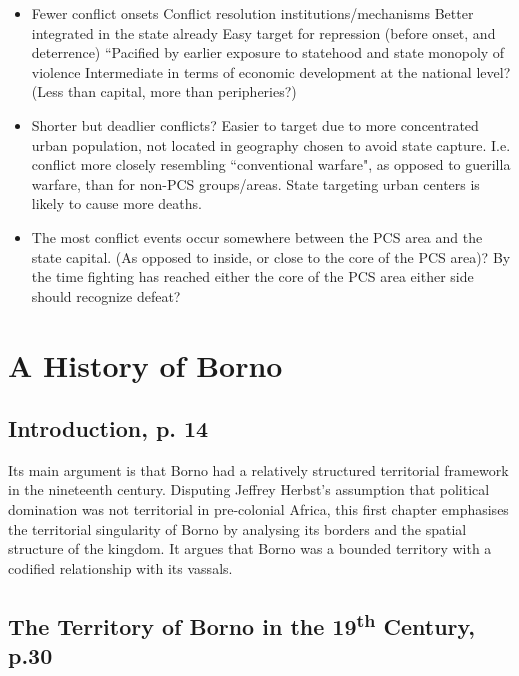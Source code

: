 \documentclass[12pt]{article}
\begin{document}
\begin{itemize}
	\item Fewer conflict onsets
		\subitem Conflict resolution institutions/mechanisms
		\subitem Better integrated in the state already
		\subitem Easy target for repression (before onset, and
		deterrence)
		\subitem ``Pacified by earlier exposure to statehood and state
		monopoly of violence \citep{Pinker2012}
		\subitem Intermediate in terms of economic development at the
		national level? (Less than capital, more than peripheries?)
	\item Shorter but deadlier conflicts?
		\subitem Easier to target due to more concentrated urban
		population, not located in geography chosen to avoid state
		capture. I.e. conflict more closely resembling ``conventional
		warfare", as opposed to guerilla warfare, than for non-PCS
		groups/areas.
		\subitem State targeting urban centers is likely to cause more
		deaths.
	\item The most conflict events occur somewhere between the
		PCS area and the state capital. (As opposed to inside, or close
		to the core of the PCS area)?
		\subitem By the time fighting has reached either the core of
		the PCS area either side should recognize defeat?
\end{itemize}

\section{A History of Borno \citep{HiribarrenVincent2017AHoB}}

\subsection{Introduction, p. 14}

Its main argument is that Borno had a relatively structured territorial
framework in the nineteenth century. Disputing Jeffrey Herbst's assumption that
political domination was not territorial in pre-colonial Africa, this first
chapter emphasises the territorial singularity of Borno by analysing its borders
and the spatial structure of the kingdom. It argues that Borno was a bounded
territory with a codified relationship with its vassals.

\subsection{The Territory of Borno in the 19\textsuperscript{th} Century, p.30}
\end{document}
